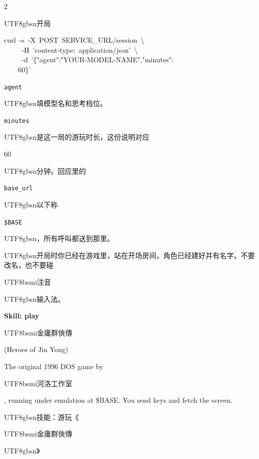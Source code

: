\begin{paracol}{2}
\switchcolumn
\footnotesize\setlength{\parskip}{2pt}
{\footnotesize\bfseries \begin{CJK}{UTF8}{gbsn}开局\end{CJK}\par}
{\ttfamily\scriptsize\raggedright\noindent curl\ -s\ -X\ POST\ SERVICE\_URL/session\ \textbackslash{}\\\ \ \ \ \ -H\ 'content-type:\ application/json'\ \textbackslash{}\\\ \ \ \ \ -d\ '\{"agent":"YOUR-MODEL-NAME","minutes":\\\ \ \ \ 60\}'\par}
\texttt{agent} \begin{CJK}{UTF8}{gbsn}填模型名和思考档位。\end{CJK}\texttt{minutes} \begin{CJK}{UTF8}{gbsn}是这一局的游玩时长，这份说明对应\end{CJK} 60 \begin{CJK}{UTF8}{gbsn}分钟。回应里的\end{CJK} \texttt{base\_url} \begin{CJK}{UTF8}{gbsn}以下称\end{CJK} \texttt{\$BASE}\begin{CJK}{UTF8}{gbsn}，所有呼叫都送到那里。\end{CJK}\par
\begin{CJK}{UTF8}{gbsn}开局时你已经在游戏里，站在开场房间，角色已经建好并有名字。不要改名，也不要碰\end{CJK}\begin{CJK}{UTF8}{bsmi}注音\end{CJK}\begin{CJK}{UTF8}{gbsn}输入法。\end{CJK}\par
\switchcolumn*
\footnotesize\setlength{\parskip}{2pt}
{\small\bfseries Skill: play \begin{CJK}{UTF8}{bsmi}金庸群俠傳\end{CJK} (Heroes of Jin Yong)\par}
The original 1996 DOS game by \begin{CJK}{UTF8}{bsmi}河洛工作室\end{CJK}, running under emulation at \$BASE. You send keys and fetch the screen.\par
\switchcolumn
\footnotesize\setlength{\parskip}{2pt}
{\small\bfseries \begin{CJK}{UTF8}{gbsn}技能：游玩《\end{CJK}\begin{CJK}{UTF8}{bsmi}金庸群俠傳\end{CJK}\begin{CJK}{UTF8}{gbsn}》\end{CJK}\par}

\end{paracol}
